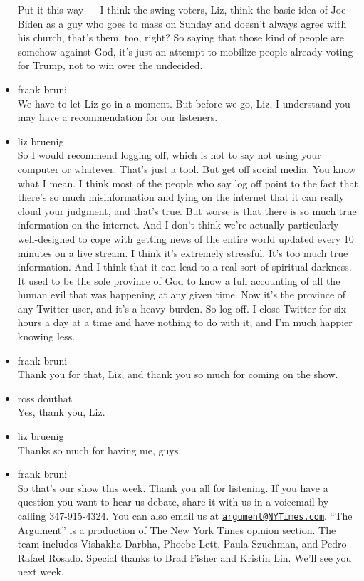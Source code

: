\begin{itemize}
  Put it this way --- I think the swing voters, Liz, think the basic
  idea of Joe Biden as a guy who goes to mass on Sunday and doesn't
  always agree with his church, that's them, too, right? So saying that
  those kind of people are somehow against God, it's just an attempt to
  mobilize people already voting for Trump, not to win over the
  undecided.
\item
  frank bruni\\
  We have to let Liz go in a moment. But before we go, Liz, I understand
  you may have a recommendation for our listeners.
\item
  liz bruenig\\
  So I would recommend logging off, which is not to say not using your
  computer or whatever. That's just a tool. But get off social media.
  You know what I mean. I think most of the people who say log off point
  to the fact that there's so much misinformation and lying on the
  internet that it can really cloud your judgment, and that's true. But
  worse is that there is so much true information on the internet. And I
  don't think we're actually particularly well-designed to cope with
  getting news of the entire world updated every 10 minutes on a live
  stream. I think it's extremely stressful. It's too much true
  information. And I think that it can lead to a real sort of spiritual
  darkness. It used to be the sole province of God to know a full
  accounting of all the human evil that was happening at any given time.
  Now it's the province of any Twitter user, and it's a heavy burden. So
  log off. I close Twitter for six hours a day at a time and have
  nothing to do with it, and I'm much happier knowing less.
\item
  frank bruni\\
  Thank you for that, Liz, and thank you so much for coming on the show.
\item
  ross douthat\\
  Yes, thank you, Liz.
\item
  liz bruenig\\
  Thanks so much for having me, guys.
\item
  frank bruni\\
  So that's our show this week. Thank you all for listening. If you have
  a question you want to hear us debate, share it with us in a voicemail
  by calling 347-915-4324. You can also email us at
  \href{mailto:argument@NYTimes.com}{\nolinkurl{argument@NYTimes.com}}.
  ``The Argument'' is a production of The New York Times opinion
  section. The team includes Vishakha Darbha, Phoebe Lett, Paula
  Szuchman, and Pedro Rafael Rosado. Special thanks to Brad Fisher and
  Kristin Lin. We'll see you next week.


\end{itemize}
